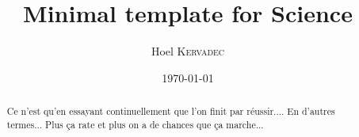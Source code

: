\documentclass[11pt, a4paper, twocolumn]{article}
\title{Minimal template for Science}
\author{Hoel \textsc{Kervadec}}
\date{\today}
\begin{document}
    \maketitle

    \begin{abstract}
        Ce n'est qu'en essayant continuellement que l'on finit par réussir....
        En d'autres termes... Plus ça rate et plus on a de chances que ça marche...
    \end{abstract}

    \setcounter{tocdepth}{2}
    \tableofcontents

    \setlength{\parskip}{5pt}
    

    

    
    
\end{document}
